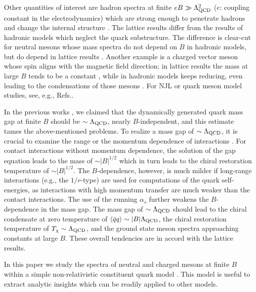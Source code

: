 Other quantities of interest are hadron spectra at finite $eB \gg \Lambda_{\rm QCD}^2$ ($e$: coupling constant in the electrodynamics) which are strong enough to penetrate hadrons and change the internal structure \cite{Fukushima:2012kc,Taya:2014nha}. 
The lattice results differ from the results of hadronic models which neglect the quark substructure. 
The difference is clear-cut for neutral mesons whose mass spectra do not depend on $B$ in hadronic models, but do depend in lattice results \cite{Bali:2017ian}. 
Another example is a charged vector meson whose spin aligns with the magnetic field direction; 
in lattice results the mass at large $B$ tends to be a constant \cite{Bali:2017ian}, while in hadronic models keeps reducing, even leading to the condensations of those mesons \cite{Chernodub:2010qx}. 
For  NJL or quark meson model studies, see, e.g., Refs.\cite{Chernodub:2011mc,Sheng:2020hge,Liu:2018zag,Wang:2017vtn,Avancini:2018svs}.


In the previous works  \cite{Kojo:2012js,Kojo:2013uua,Kojo:2014gha,Hattori:2015aki}, 
we claimed that the dynamically generated quark mass gap at finite $B$ should be $\sim \Lambda_{\rm QCD}$, nearly $B$-independent, and this estimate tames the above-mentioned problems. 
To realize a mass gap of $\sim \Lambda_{\rm QCD}$, it is crucial to examine the range or the momentum dependence of interactions \cite{Braun:2014fua,Mueller:2015fka,Mueller:2014tea,Ayala:2015bgv}. 
For contact interactions without momentum dependence, the solution of the gap equation leads to the mass of $\sim |B|^{1/2}$ which in turn leads to the chiral restoration temperature of $\sim |B|^{1/2}$. 
The $B$-dependence, however, is much milder if long-range interactions (e.g., the $1/r$-type) are used for computations of the quark self-energies,
as interactions with high momentum transfer are much weaker than the contact interactions.
The use of the running $\alpha_s$ further weakens the $B$-dependence in the mass gap. 
The mass gap of $\sim \Lambda_{\rm QCD}$ should lead to the chiral condensate at zero temperature of $\langle \bar{q} q \rangle \sim |B| \Lambda_{\rm QCD}$, 
the chiral restoration temperature of $T_\chi \sim \Lambda_{\rm QCD}$, 
and the ground state meson spectra approaching constants at large $B$. 
These overall tendencies are in accord with the lattice results. %

In this paper we study the spectra of neutral and charged mesons at finite $B$ within a simple non-relativistic constituent quark model \cite{Zeldovich:1967rt,Sakharov:1980ph,DeRujula:1975qlm,Isgur:1979be}. This model is useful to extract analytic insights which can be readily applied to other models. 

